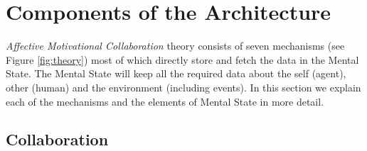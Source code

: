 \documentclass[12pt]{report}
\begin{document}
\section{Components of the Architecture}
\label{sec:architecture-components}

\textit{Affective Motivational Collaboration} theory consists of seven
mechanisms (see Figure \ref{fig:theory}) most of which directly store and fetch
the data in the Mental State. The Mental State will keep all the required data
about the self (agent), other (human) and the environment (including events). In
this section we explain each of the mechanisms and the elements of Mental State
in more detail.

\subsection{Collaboration}
\end{document}
